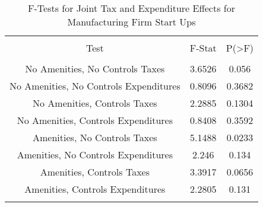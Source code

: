 
\begin{table}[!htbp] \centering 
  \caption{F-Tests for Joint Tax and Expenditure Effects for Manufacturing Firm Start Ups} 
  \label{31-33Ftests} 
\begin{tabular}{@{\extracolsep{5pt}} ccc} 
\\[-1.8ex]\hline 
\hline \\[-1.8ex] 
Test & F-Stat & P(\textgreater F) \\ 
\hline \\[-1.8ex] 
No Amenities, No Controls Taxes & 3.6526 & 0.056 \\ 
No Amenities, No Controls Expenditures & 0.8096 & 0.3682 \\ 
No Amenities, Controls Taxes & 2.2885 & 0.1304 \\ 
No Amenities, Controls Expenditures & 0.8408 & 0.3592 \\ 
Amenities, No Controls Taxes & 5.1488 & 0.0233 \\ 
Amenities, No Controls Expenditures & 2.246 & 0.134 \\ 
Amenities, Controls Taxes & 3.3917 & 0.0656 \\ 
Amenities, Controls Expenditures & 2.2805 & 0.131 \\ 
\hline \\[-1.8ex] 
\end{tabular} 
\end{table} 
